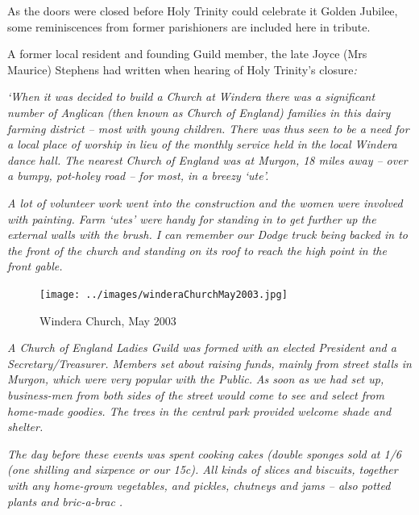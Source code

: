As the doors were closed before Holy Trinity could celebrate it Golden Jubilee, some reminiscences from former parishioners are included here in tribute.



A former local resident and founding Guild member, the late Joyce (Mrs Maurice) Stephens had written when hearing of Holy Trinity's closure\emph{:}



\emph{`When it was decided to build a Church at Windera there was a significant number of Anglican (then known as Church of England) families in this dairy farming district -- most with young children. There was thus seen to be a need for a local place of worship in lieu of the monthly service held in the local Windera dance hall. The nearest Church of England was at Murgon, 18 miles away -- over a bumpy, pot-holey road -- for most, in a breezy `ute'.}



\emph{A lot of volunteer work went into the construction and the women were involved with painting. Farm `utes' were handy for standing in to get further up the external walls with the brush. I can remember our Dodge truck being backed in to the front of the church and standing on its roof to reach the high point in the front gable.}









\begin{figure}[!htb]
\begin{center}
\texttt{[image: ../images/winderaChurchMay2003.jpg]}
\caption{Windera Church, May 2003}
\end{center}
\end{figure}




\emph{A Church of England Ladies Guild was formed with an elected President and a Secretary/Treasurer. Members set about raising funds, mainly from street stalls in Murgon, which were very popular with the Public.} \emph{As soon as we had set up, business-men from both sides of the street would come to see and select from home-made goodies. The trees in the central park provided welcome shade and shelter.}



\emph{The day before these events was spent cooking cakes (double sponges sold at 1/6 (one shilling and sixpence or our 15c). All kinds of slices and biscuits, together with any home-grown vegetables, and pickles, chutneys and jams -- also potted plants and bric-a-brac .}



